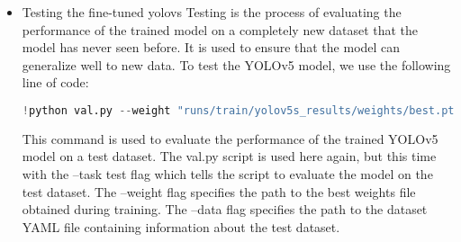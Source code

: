 \begin{itemize}
To validate the YOLOv5 model, we use the following  line of code :
\begin{lstlisting}[language=Python]
!python val.py --weight "runs/train/yolov5s_results/weights/best.pt" --data "/content/yolov5/LogoDetection-3/data.yaml"
\end{lstlisting}
The val.py script loads the trained model and evaluates it on the validation dataset specified in the data.yaml file. The --weight flag specifies the path to the weights of the trained model, and the --data flag specifies the path to the dataset configuration file.
\FloatBarrier

\begin{table}[h]

\centering
{}


\end{table}

\FloatBarrier

The validation output shows that the model achieves a precision of 0.99, a recall of 1, mAP50 of 0.955, and mAP50-95 of 0.877. These metrics indicate that the model is performing well on the validation dataset and didn't overfit that much to the training data.

\item{Testing the fine-tuned yolovs}
Testing is the process of evaluating the performance of the trained model on a completely new dataset that the model has never seen before. It is used to ensure that the model can generalize well to new data.
To test the YOLOv5 model, we use the following line of code:
\begin{lstlisting}[language=Python]
!python val.py --weight "runs/train/yolov5s_results/weights/best.pt" --data "/content/yolov5/LogoDetection-3/data.yaml" --task test
\end{lstlisting}
This command is used to evaluate the performance of the trained YOLOv5 model on a test dataset. The val.py script is used here again, but this time with the --task test flag which tells the script to evaluate the model on the test dataset. The --weight flag specifies the path to the best weights file obtained during training. The --data flag specifies the path to the dataset YAML file containing information about the test dataset. 
\FloatBarrier


\end{itemize}
